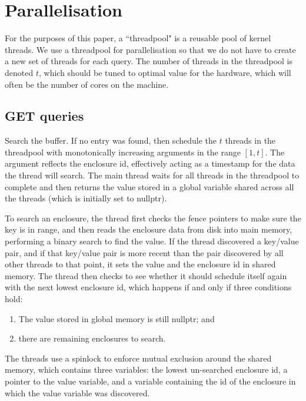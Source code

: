 \documentclass{acm}
\begin{document}
\section{Parallelisation}

For the purposes of this paper, a ``threadpool" is a reusable pool of kernel threads. We use a threadpool for parallelisation so that we do not have to create a new set of threads for each query. The number of threads in the threadpool is denoted $t$, which should be tuned to optimal value for the hardware, which will often be the number of cores on the machine.

\subsection{GET queries}

Search the buffer. If no entry was found, then schedule the $t$ threads in the threadpool with monotonically increasing arguments in the range $[1, t]$. The argument reflects the enclosure id, effectively acting as a timestamp for the data the thread will search. The main thread waits for all threads in the threadpool to complete and then returns the value stored in a global variable shared across all the threads (which is initially set to nullptr).

To search an enclosure, the thread first checks the fence pointers to make sure the key is in range, and then reads the enclosure data from disk into main memory, performing a binary search to find the value. If the thread discovered a key/value pair, and if that key/value pair is more recent than the pair discovered by all other threads to that point, it sets the value and the enclosure id in shared memory. The thread then checks to see whether it should schedule itself again with the next lowest enclosure id, which happens if and only if three conditions hold:

\begin{enumerate} 
  \item The value stored in global memory is still nullptr; and
  \item there are remaining enclosures to search. 
\end{enumerate}

The threads use a spinlock to enforce mutual exclusion around the shared memory, which contains three variables: the lowest un-searched enclosure id, a pointer to the value variable, and a variable containing the id of the enclosure in which the value variable was discovered.
\end{document}
